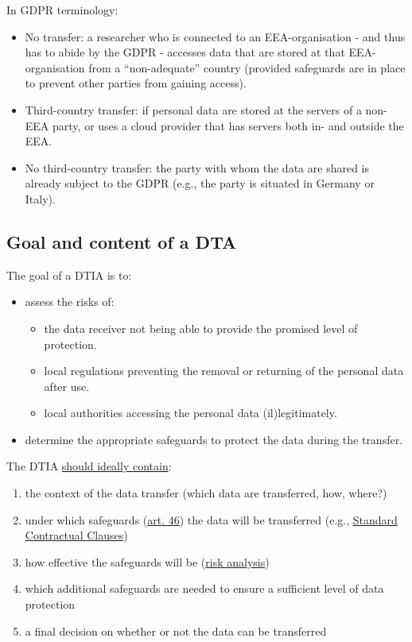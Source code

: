\documentclass[
]{book}
\providecommand{\tightlist}{%
  \setlength{\itemsep}{0pt}\setlength{\parskip}{0pt}}
\begin{document}
In GDPR terminology:

\begin{itemize}
\tightlist
\item
  No transfer: a researcher who is connected to an EEA-organisation - and thus
  has to abide by the GDPR - accesses data that are stored at that EEA-organisation
  from a ``non-adequate'' country (provided safeguards are in place to prevent other
  parties from gaining access).
\item
  Third-country transfer: if personal data are stored at the servers of a
  non-EEA party, or uses a cloud provider that has servers both in- and outside
  the EEA.
\item
  No third-country transfer: the party with whom the data are shared is already
  subject to the GDPR (e.g., the party is situated in Germany or Italy).
\end{itemize}

\hypertarget{dtia-goal-content}{%
\subsection{Goal and content of a DTA}\label{dtia-goal-content}}

The goal of a DTIA is to:

\begin{itemize}
\tightlist
\item
  assess the risks of:

  \begin{itemize}
  \tightlist
  \item
    the data receiver not being able to provide the promised level of protection.
  \item
    local regulations preventing the removal or returning of the personal data after use.
  \item
    local authorities accessing the personal data (il)legitimately.
  \end{itemize}
\item
  determine the appropriate safeguards to protect the data during the transfer.
\end{itemize}

The DTIA \href{https://edpb.europa.eu/system/files/2021-06/edpb_recommendations_202001vo.2.0_supplementarymeasurestransferstools_en.pdf}{should ideally contain}:

\begin{enumerate}
\def\labelenumi{\arabic{enumi}.}
\tightlist
\item
  the context of the data transfer (which data are transferred, how, where?)
\item
  under which safeguards (\href{https://gdpr-info.eu/art-46-gdpr/}{art. 46})
  the data will be transferred (e.g., \protect\hyperlink{scc}{Standard Contractual Clauses})
\item
  how effective the safeguards will be (\protect\hyperlink{risk-assessment}{risk analysis})
\item
  which additional safeguards are needed to ensure a sufficient level of data protection
\item
  a final decision on whether or not the data can be transferred
\end{enumerate}
\end{document}
